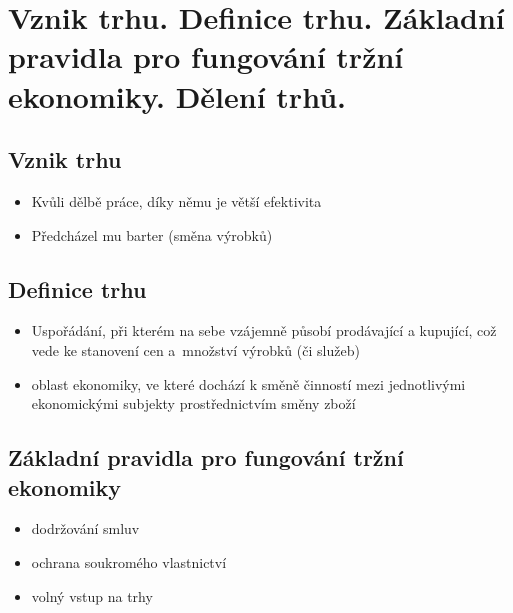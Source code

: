 \clearpage
\section{Vznik trhu. Definice trhu. Základní pravidla pro fungování tržní ekonomiky. Dělení trhů.}

\subsection{Vznik trhu}
\begin{itemize}
    \item Kvůli dělbě práce, díky němu je větší efektivita
    \item Předcházel mu barter (směna výrobků)
\end{itemize}

\subsection{Definice trhu}
\begin{itemize}
    \item Uspořádání, při kterém na sebe vzájemně působí prodávající a kupující, což vede ke stanovení cen 
    a~množství výrobků (či služeb)
    \item oblast ekonomiky, ve které dochází k směně činností mezi jednotlivými ekonomickými subjekty
    prostřednictvím směny zboží
\end{itemize}

\subsection{Základní pravidla pro fungování tržní ekonomiky}
\begin{itemize}
    \item dodržování smluv
    \item ochrana soukromého vlastnictví
    \item volný vstup na trhy
\end{itemize}

